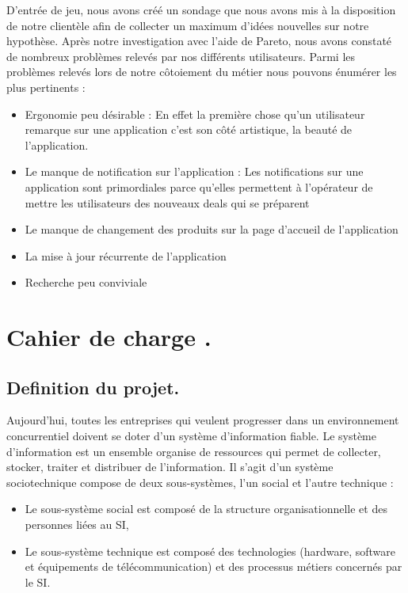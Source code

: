  D’entrée de jeu, nous avons créé un sondage que nous avons mis à la disposition de notre clientèle afin de collecter un maximum d’idées nouvelles sur notre hypothèse. Après notre investigation avec l’aide de Pareto\cite{Ref8}, nous avons constaté de nombreux problèmes relevés par nos différents utilisateurs. Parmi les problèmes relevés lors de notre côtoiement du métier nous pouvons énumérer les plus pertinents :
 
\begin{itemize}[label=\textbullet, font=\LARGE \color{blue}] 
	\item Ergonomie peu désirable :  En effet la première chose qu’un utilisateur remarque sur une application c’est son côté artistique, la beauté de l’application.
	\item Le manque de notification sur l’application : Les notifications sur une application sont primordiales parce qu’elles permettent à l’opérateur de mettre les utilisateurs des nouveaux deals qui se préparent
	\item Le manque de changement des produits sur la page d’accueil de l’application 
	\item La mise à jour récurrente de l’application 
	\item Recherche peu conviviale
\end{itemize}


\section{Cahier de charge .}

\subsection{Definition du projet.}

Aujourd’hui, toutes les entreprises qui veulent progresser dans un environnement concurrentiel doivent se doter d’un système d’information fiable. Le système d’information est un ensemble organise de ressources qui permet de collecter, stocker, traiter et distribuer de l’information. Il s’agit d’un système sociotechnique compose de deux sous-systèmes, l’un social et l’autre technique : 

\begin{itemize}[label=\textbullet, font=\LARGE \color{blue}] 
	\item Le sous-système social est composé de la structure organisationnelle et des personnes liées au SI,
	\item Le sous-système technique est composé des technologies (hardware, software et équipements de télécommunication) et des processus métiers concernés par le SI.
\end{itemize}

